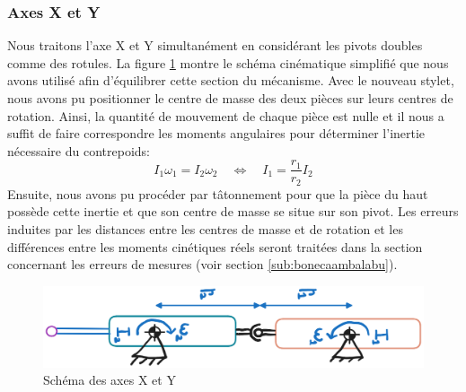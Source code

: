 \documentclass[a4paper, 11pt]{article} %
\begin{document}
\subsubsection*{Axes X et Y}
Nous traitons l'axe X et Y simultanément en considérant les pivots doubles comme des rotules. La figure \ref{equ_xy} montre le schéma cinématique simplifié que nous avons utilisé afin d'équilibrer cette section du mécanisme. Avec le nouveau stylet, nous avons pu positionner le centre de masse des deux pièces sur leurs centres de rotation. Ainsi, la quantité de mouvement de chaque pièce est nulle et il nous a suffit de faire correspondre les moments angulaires pour déterminer l'inertie nécessaire du contrepoids:
$$
I_1\omega_1 = I_2\omega_2 \quad \Leftrightarrow \quad I_1 = \frac{r_1}{r_2}I_2
$$
Ensuite, nous avons pu procéder par tâtonnement pour que la pièce du haut possède cette inertie et que son centre de masse se situe sur son pivot. Les erreurs induites par les distances entre les centres de masse et de rotation et les différences entre les moments cinétiques réels seront traitées dans la section concernant les erreurs de mesures (voir section \ref{sub:bonecaambalabu}).
\begin{figure}[H]
    \centering
    \includegraphics[width=0.5\linewidth]{images/equilibrageXY_schema.png}
    \caption{Schéma des axes X et Y}
    \label{equ_xy}
\end{figure}
\end{document}
